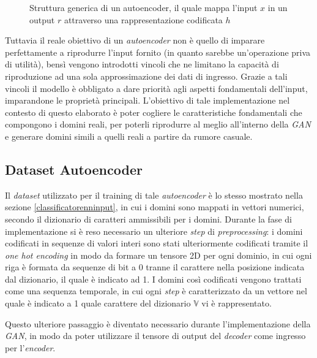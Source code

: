 \begin{figure}[htb]
    \centering
	
	\caption{Struttura generica di un autoencoder, il quale mappa l'input $x$ in un output $r$ attraverso una rappresentazione codificata $h$}
\label{fig:autoencodergen}
\end{figure}

Tuttavia il reale obiettivo di un \textit{autoencoder }non è quello di imparare perfettamente a riprodurre l'input fornito (in quanto sarebbe un'operazione priva di utilità), bensì vengono introdotti vincoli che ne limitano la capacità di riproduzione ad una sola approssimazione dei dati di ingresso. Grazie a tali vincoli il modello è obbligato a dare priorità agli aspetti fondamentali dell'input, imparandone le proprietà principali. L'obiettivo di tale implementazione nel contesto di questo elaborato è poter cogliere le caratteristiche fondamentali che compongono i domini reali, per poterli riprodurre al meglio all'interno della \textit{GAN} e generare domini simili a quelli reali a partire da rumore casuale.

\subsection{Dataset Autoencoder}
\label{datasetautoencoder}
Il \textit{dataset} utilizzato per il training di tale \textit{autoencoder} è lo stesso mostrato nella sezione \ref{classificatorenninput}, in cui i domini sono mappati in vettori numerici, secondo il dizionario di caratteri ammissibili per i domini. Durante la fase di implementazione si è reso necessario un ulteriore \textit{step} di \textit{preprocessing}: i domini codificati in sequenze di valori interi sono stati ulteriormente codificati tramite il \textit{one hot encoding} \cite{onehot} in modo da formare un tensore 2D per ogni dominio, in cui ogni riga è formata da sequenze di bit a 0 tranne il carattere nella posizione indicata dal dizionario, il quale è indicato ad 1. I domini così codificati vengono trattati come una sequenza temporale, in cui ogni \textit{step} è caratterizzato da un vettore nel quale è indicato a 1 quale carattere del dizionario $\mathbb{V}$ vi è rappresentato. 


Questo ulteriore passaggio è diventato necessario durante l'implementazione della \textit{GAN}, in modo da poter utilizzare il tensore di output del \textit{decoder} come ingresso per l'\textit{encoder}.


